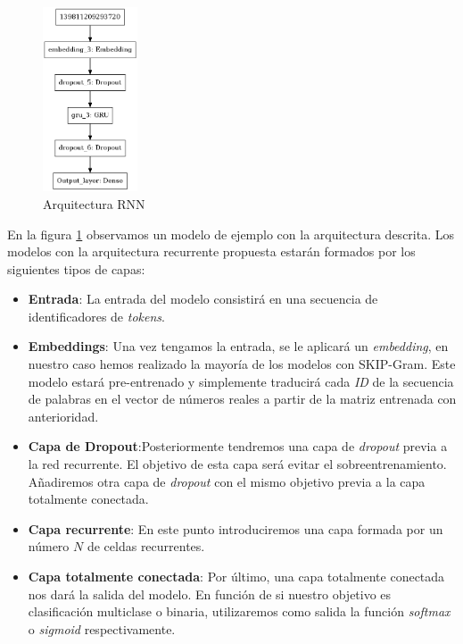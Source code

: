 \begin{figure}[!ht]
	\centering
	\includegraphics[width=0.25\textwidth]{images/super/arq_rnn1}
	\caption{Arquitectura RNN}
	\label{fig:arqrnn1}
\end{figure}


En la figura \ref{fig:arqrnn1} observamos un modelo de ejemplo con la arquitectura descrita. Los modelos con la arquitectura recurrente propuesta estarán formados por los siguientes tipos de capas: 

\begin{itemize}
\item \textbf{Entrada}: La entrada del modelo consistirá en una secuencia de identificadores de \textit{tokens}.

 \item \textbf{Embeddings}: Una vez tengamos la entrada, se le aplicará un \textit{embedding}, en nuestro caso hemos realizado la mayoría de los modelos con SKIP-Gram. Este modelo estará pre-entrenado y simplemente traducirá cada \textit{ID} de la secuencia de palabras en el vector de números reales a partir de la matriz entrenada con anterioridad. 
 
 
  \item \textbf{Capa de Dropout}:Posteriormente tendremos una capa de \textit{dropout} previa a la red recurrente. El objetivo de esta capa será evitar el sobreentrenamiento. Añadiremos otra capa de \textit{dropout} con el mismo objetivo previa a la capa totalmente conectada.
 
 \item \textbf{Capa recurrente}: En este punto introduciremos una capa formada por un número $N$ de celdas recurrentes. 
 
 
   \item \textbf{Capa totalmente conectada}: Por último, una capa totalmente conectada nos dará la salida del modelo. En función de si nuestro objetivo es clasificación multiclase o binaria, utilizaremos como salida la función \textit{softmax} o \textit{sigmoid} respectivamente.
 
\end{itemize}


